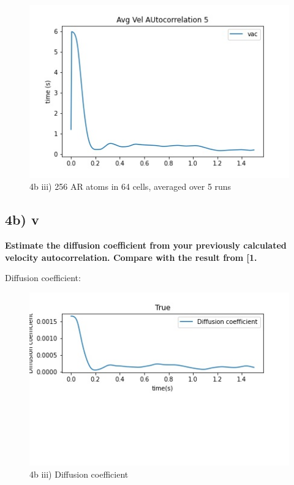 \documentclass[a4paper,10pt,english]{article}
\begin{document}
\begin{figure}[h!]
        \centering 
        \includegraphics[scale=0.6]{./py/4biv_avg.jpg} 
        \caption{4b iii) 256 AR atoms in 64 cells, averaged over 5 runs}
        \label{fig:4biii}
\end{figure}




\subsection*{4b) v}
\textbf{Estimate the diffusion coefficient from your previously calculated velocity autocorrelation. Compare with the result from [1.}

Diffusion coefficient:

\begin{figure}[h!]
        \centering 
        \includegraphics[scale=0.6]{./py/4b_v.jpg} 
        \caption{4b iii) Diffusion coefficient}
        \label{fig:4bv}
\end{figure}
\end{document}
